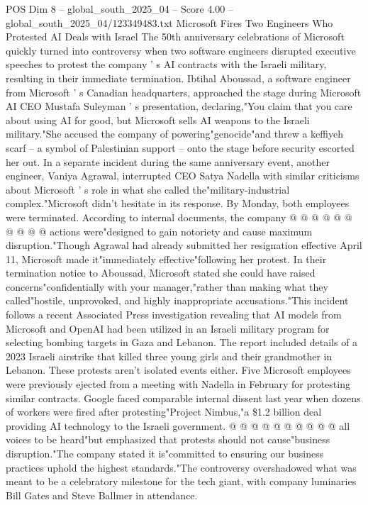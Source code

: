 \begin{textsample}{POS Dim 8 – global\_south\_2025\_04 – Score 4.00 – global\_south\_2025\_04/123349483.txt}  \label{ex:f8_pos_167}
Microsoft Fires Two Engineers Who Protested AI Deals with Israel The 50th anniversary celebrations of Microsoft quickly turned into controversy when two software engineers disrupted executive speeches to protest the company ' s AI contracts with the Israeli military, resulting in their immediate termination.
Ibtihal Aboussad, a software engineer from Microsoft ' s Canadian headquarters, approached the stage during Microsoft AI CEO Mustafa Suleyman ' s presentation, declaring,"You claim that you care about using AI for good, but Microsoft sells AI weapons to the Israeli military."She accused the company of powering"genocide"and threw a keffiyeh scarf -- a symbol of Palestinian support -- onto the stage before security escorted her out.
In a separate incident during the same anniversary event, another engineer, Vaniya Agrawal, interrupted CEO Satya Nadella with similar criticisms about Microsoft ' s role in what she called the"military-industrial complex."Microsoft didn't hesitate in its response.
By Monday, both employees were terminated.
According to internal documents, the company @ @ @ @ @ @ @ @ @ @ actions were"designed to gain notoriety and cause maximum disruption."Though Agrawal had already submitted her resignation effective April 11, Microsoft made it"immediately effective"following her protest.
In their termination notice to Aboussad, Microsoft stated she could have raised concerns"confidentially with your manager,"rather than making what they called"hostile, unprovoked, and highly inappropriate accusations."This incident follows a recent Associated Press investigation revealing that AI models from Microsoft and OpenAI had been utilized in an Israeli military program for selecting bombing targets in Gaza and Lebanon.
The report included details of a 2023 Israeli airstrike that killed three young girls and their grandmother in Lebanon.
These protests aren't isolated events either.
Five Microsoft employees were previously ejected from a meeting with Nadella in February for protesting similar contracts.
Google faced comparable internal dissent last year when dozens of workers were fired after protesting"Project Nimbus,"a \$1.2 billion deal providing AI technology to the Israeli government. @ @ @ @ @ @ @ @ @ @ all voices to be heard"but emphasized that protests should not cause"business disruption."The company stated it is"committed to ensuring our business practices uphold the highest standards."The controversy overshadowed what was meant to be a celebratory milestone for the tech giant, with company luminaries Bill Gates and Steve Ballmer in attendance.

\end{textsample}
